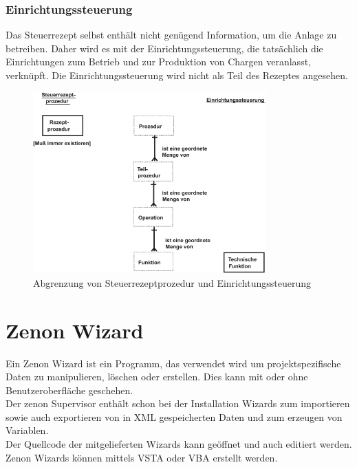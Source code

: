 \subsubsection{Einrichtungssteuerung}
Das Steuerrezept selbst enthält nicht genügend Information, um die Anlage zu betreiben. Daher wird es mit der Einrichtungssteuerung, die tatsächlich die Einrichtungen zum Betrieb und zur Produktion von Chargen veranlasst, verknüpft. Die Einrichtungssteuerung wird nicht als Teil des Rezeptes angesehen.
\begin{figure}[h!]
		\centering
		\includegraphics[width=0.8\textwidth]{graphics/stateoftheart/steuerrezeptprozedur_einrichtungssteuerung.png}
		\caption{Abgrenzung von Steuerrezeptprozedur und Einrichtungssteuerung}
\end{figure}


\section{Zenon Wizard}
Ein Zenon Wizard ist ein Programm, das verwendet wird um projektspezifische Daten zu manipulieren, löschen oder erstellen. Dies kann mit oder ohne Benutzeroberfläche geschehen.\\
Der zenon Supervisor enthält schon bei der Installation Wizards zum importieren sowie auch exportieren von in XML gespeicherten Daten und zum erzeugen von Variablen.\\
Der Quellcode der mitgelieferten Wizards kann geöffnet und auch editiert werden. Zenon Wizards können mittels VSTA oder VBA erstellt werden.

